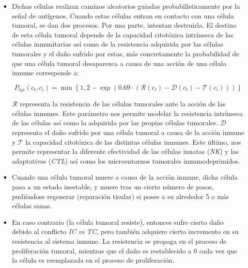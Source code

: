 \begin{itemize}
 


\item Dichas células realizan caminos aleatorios guiadas probabilísticamente por la señal de antígenos. Cuando estas células entran en contacto con una célula tumoral, se dan dos procesos.  Por una parte, intentan destruirla. El destino de esta célula tumoral depende de la capacidad citotóxica intrínseca de las células inmunitarias así como de la resistencia adquirida por las células tumorales y el daño sufrido por estas, más concretamente la probabilidad de que una célula tumoral desaparezca a causa de una acción de una célula inmune corresponde a: 

\begin{equation}
    P_{lys}(c_t, c_i) = \min \left\lbrace 1, 2 - \exp{\left(0.69 \cdot (\mathcal{R}(c_t) - \mathcal{D}(c_t) - \mathcal{T}(c_i)) \right)} \right\rbrace
\end{equation}

$\mathcal{R}$ representa la resistencia de las células tumorales ante la acción de las células inmunes. Este parámetro nos permite modelar la resistencia intrínseca de las células así como la adquirida por las propias células tumorales. $\mathcal{D}$ representa el daño sufrido por una célula tumoral a causa de la acción inmune y $\mathcal{T}$ la capacidad citotóxica de las distintas células inmunes. Este último, nos permite representar la diferente efectividad de las células innatas (\textit{NK}) y las adaptativas (\textit{CTL}) así como los microentornos tumorales inmunodeprimidos.\\

\item Cuando una célula tumoral muere a causa de la acción inmune, dicha célula pasa a un estado inestable, y muere tras un cierto número de pasos, pudiéndose regenerar (reparación tisular) si posee a su alrededor 5 o más células sanas.\\

\item En caso contrario (la célula tumoral resiste), entonces sufre cierto daño debido al conflicto \textit{IC vs TC}, pero también adquiere cierto incremento en su resistencia al sistema inmune. La resistencia se propaga en el proceso de proliferación tumoral, mientras que el daño es restablecido a $0$ cada vez que la célula es reemplazada en el proceso de proliferación.\\  



\end{itemize}

